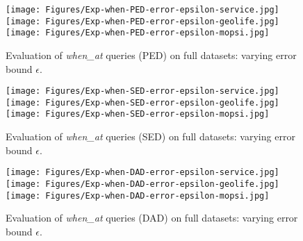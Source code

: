 {\begin{figure*}[tb!]
	\centering
	\texttt{[image: Figures/Exp-when-PED-error-epsilon-service.jpg]}\hspace{0.5ex}
	\texttt{[image: Figures/Exp-when-PED-error-epsilon-geolife.jpg]}\hspace{0.5ex}
	\texttt{[image: Figures/Exp-when-PED-error-epsilon-mopsi.jpg]}
	\vspace{-2ex}
	\caption{\small {Evaluation of \emph{when\_at} queries (PED) on full datasets: varying error bound $\epsilon$.}}
	\label{fig:query-when-ped-epsilon}
	\vspace{-1.0ex}
\end{figure*}
\begin{figure*}[tb!]
	\centering
	\texttt{[image: Figures/Exp-when-SED-error-epsilon-service.jpg]}\hspace{0.5ex}
	\texttt{[image: Figures/Exp-when-SED-error-epsilon-geolife.jpg]}\hspace{0.5ex}
	\texttt{[image: Figures/Exp-when-SED-error-epsilon-mopsi.jpg]}
	\vspace{-2ex}
	\caption{\small {Evaluation of \emph{when\_at} queries (SED) on full datasets: varying error bound $\epsilon$.}}
	\label{fig:query-when-sed-epsilon}
	\vspace{-1.0ex}
\end{figure*}
\begin{figure*}[tb!]
	\centering
	\texttt{[image: Figures/Exp-when-DAD-error-epsilon-service.jpg]}\hspace{0.5ex}
	\texttt{[image: Figures/Exp-when-DAD-error-epsilon-geolife.jpg]}\hspace{0.5ex}
	\texttt{[image: Figures/Exp-when-DAD-error-epsilon-mopsi.jpg]}
	\vspace{-2ex}
	\caption{\small {Evaluation of \emph{when\_at} queries (DAD) on full datasets: varying error bound $\epsilon$.}}
	\label{fig:query-when-dad-epsilon}
	\vspace{-1.0ex}
\end{figure*}

}

